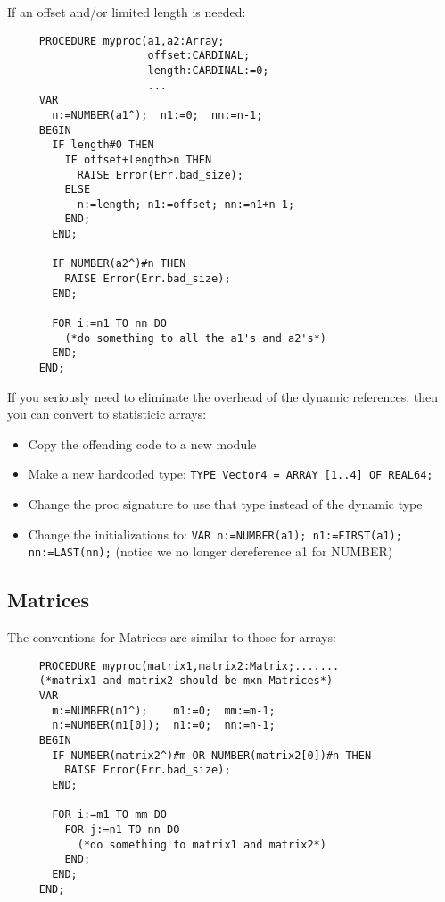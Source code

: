 If an offset and/or limited length is needed:
\begin{tt} \begin{verbatim}
     PROCEDURE myproc(a1,a2:Array;
                      offset:CARDINAL;
                      length:CARDINAL:=0;
                      ...
     VAR
       n:=NUMBER(a1^);  n1:=0;  nn:=n-1;
     BEGIN
       IF length#0 THEN
         IF offset+length>n THEN
           RAISE Error(Err.bad_size);
         ELSE
           n:=length; n1:=offset; nn:=n1+n-1;
         END;
       END;
     
       IF NUMBER(a2^)#n THEN
         RAISE Error(Err.bad_size);
       END;
     
       FOR i:=n1 TO nn DO
         (*do something to all the a1's and a2's*)
       END;
     END;
\end{verbatim} \end{tt}

If you seriously need to eliminate the overhead of the
dynamic references, then you can convert to statisticic arrays:
\begin{itemize}
   \item Copy the offending code to a new module
   \item Make a new hardcoded type:
       {\tt TYPE Vector4 = ARRAY [1..4] OF REAL64;}
   \item Change the proc signature to use that type instead
       of the dynamic type
   \item Change the initializations to:
       {\tt VAR n:=NUMBER(a1); n1:=FIRST(a1); nn:=LAST(nn);}
       (notice we no longer dereference a1 for NUMBER)
\end{itemize}
     
\subsection{Matrices}
The conventions for Matrices are similar to those for
arrays:
\begin{tt} \begin{verbatim}
     PROCEDURE myproc(matrix1,matrix2:Matrix;.......
     (*matrix1 and matrix2 should be mxn Matrices*)
     VAR
       m:=NUMBER(m1^);    m1:=0;  mm:=m-1;
       n:=NUMBER(m1[0]);  n1:=0;  nn:=n-1;
     BEGIN
       IF NUMBER(matrix2^)#m OR NUMBER(matrix2[0])#n THEN
         RAISE Error(Err.bad_size);
       END;
     
       FOR i:=m1 TO mm DO
         FOR j:=n1 TO nn DO
           (*do something to matrix1 and matrix2*)
         END;
       END;
     END;
\end{verbatim} \end{tt}

